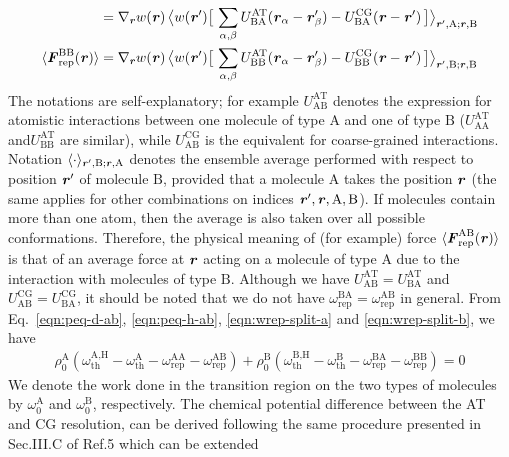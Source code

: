 \documentclass[a4paper,preprint,unsortedaddress]{revtex4-1}
\newcommand{\vect}[1]{\textbf{\textit{#1}}}
\newcommand{\AT}{{\textrm{{AT}}}}
\newcommand{\CG}{{\textrm{CG}}}
\newcommand{\thf}{{\textrm{th}}}
\newcommand{\res}{{\textrm{rep}}}
\newcommand{\hadress}{{\textrm{H}}}
\newcommand{\typea}{{\textrm{A}}}
\newcommand{\typeb}{{\textrm{B}}}
\begin{document}
{\begin{align}
  &=
  \nabla_{\vect r} w(\vect r)\,
  \big\langle w(\vect r')
  \big[\, \sum_{\alpha,\beta} U^\AT_{\typeb\typea}(\vect r_\alpha- \vect r'_\beta)
  - U^\CG_{\typeb\typea}(\vect r- \vect r') \,\big]
  \big\rangle_{\vect r',\typea; \vect r,\typeb}\\
  \langle \vect F^{\typeb\typeb}_\res(\vect r)\rangle
  &=
  \nabla_{\vect r} w(\vect r)\,
  \big\langle w(\vect r')
  \big[\, \sum_{\alpha,\beta} U^\AT_{\typeb\typeb}(\vect r_\alpha- \vect r'_\beta)
  - U^\CG_{\typeb\typeb}(\vect r- \vect r') \,\big]
  \big\rangle_{\vect r',\typeb; \vect r,\typeb}
\end{align}
The notations are self-explanatory; for example $ U^\AT_{\typea\typeb}$
denotes the expression for atomistic interactions between one molecule of type $\typea$ and one of type $\typeb$ ($U^\AT_{\typea\typea}$ and$ U^\AT_{\typeb\typeb}$ are similar),
while $ U^\CG_{\typea\typeb}$ is the equivalent for coarse-grained interactions.
Notation $\langle\cdot\rangle_{\vect r',\typeb; \vect r,\typea}$ denotes the
ensemble average performed with respect to position $\vect r'$ of molecule
$\typeb$, provided that a molecule $\typea$ takes the position $\vect r$ (the same applies for other combinations on indices ${\vect r'}, {\vect r}, {\typea}, {\typeb}$).
If molecules contain more than one atom, then the average is also taken
over all possible conformations.
Therefore, the physical meaning of (for example) 
force $\langle \vect F^{\typea\typeb}_\res(\vect r)\rangle$
is that of an average force at $\vect r$ acting on a molecule of type $\typea$  due to the interaction with molecules of type $\typeb$.
Although we have $U^\AT_{\typea\typeb} = U^\AT_{\typeb\typea}$ and
$U^\CG_{\typea\typeb} = U^\CG_{\typeb\typea}$, it should
be noted that we do not have
$\omega_\res^{\typeb\typea} = \omega_\res^{\typea\typeb}$  in general.
From Eq.~\eqref{eqn:peq-d-ab}, \eqref{eqn:peq-h-ab},
\eqref{eqn:wrep-split-a} and \eqref{eqn:wrep-split-b}, we have
\begin{align}\label{eqn:hd-rel-ab}
  \rho_0^\typea(\omega_\thf^{\typea,\hadress} - \omega_\thf^\typea
  - \omega^{\typea\typea}_\res - \omega^{\typea\typeb}_\res)
  +
  \rho_0^\typeb(\omega_\thf^{\typeb,\hadress} - \omega_\thf^\typeb
  - \omega^{\typeb\typea}_\res - \omega^{\typeb\typeb}_\res) = 0
\end{align}
We denote the work done in the transition region on the two types
of molecules by $\omega_0^\typea$ and $\omega_0^\typeb$, respectively.
The chemical potential difference between the AT and CG resolution,
can be derived following the same procedure presented in Sec.III.C of Ref.5 which can be extended
}
\end{document}

